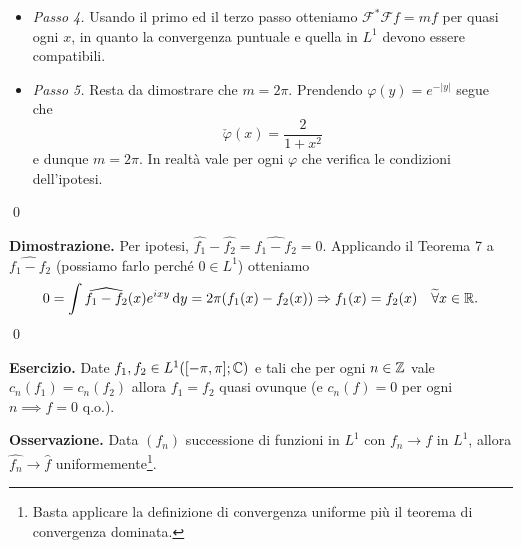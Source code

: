 \begin{itemize}
	\item \textit{Passo 4.} Usando il primo ed il terzo passo otteniamo $\mathcal F^* \mathcal F f = m f$ per quasi ogni $x$, in quanto la convergenza puntuale e quella in $L^1$ devono essere compatibili. 

	\item \textit{Passo 5.} Resta da dimostrare che $m = 2\pi$. Prendendo $\varphi(y) = e^{-|y|}$ segue che
		$$
			\check \varphi(x) = \frac{2}{1 + x^2}
		$$
		e dunque $m = 2\pi$. In realtà vale per ogni $\varphi$ che verifica le condizioni dell'ipotesi.
\end{itemize}
\qed


\textbf{Dimostrazione.} Per ipotesi, $\hat{f_1} - \hat{f_2} = \hat{f_1 - f_2} = 0$.
Applicando il Teorema 7 a $\hat{f_1 - f_2}$ (possiamo farlo perché $0 \in L^1$) otteniamo
%
$$
	0 = \int \widehat{f_1 - f_2}(x) e^{ixy} \,\mathrm{d} y = 2\pi (f_1(x) - f_2(x)) 
	\Rightarrow f_1(x) = f_2(x) \quad \widetilde\forall x \in \mathbb R.
$$
%
\qed


\textbf{Esercizio.}
Date $f_1, f_2 \in L^1([-\pi, \pi]; \mathbb C)$ e tali che per ogni $n \in \mathbb Z$ vale $c_n(f_1) = c_n(f_2)$ allora $f_1 = f_2$ quasi ovunque (e $c_n(f) = 0$ per ogni $n \implies f = 0$ q.o.).

\textbf{Osservazione.} Data $(f_n)$ successione di funzioni in $L^1$ con $f_n \to f$ in $L^1$, allora $\hat{f_n} \to \hat{f}$ uniformemente\footnote{Basta applicare la definizione di convergenza uniforme più il teorema di convergenza dominata.}. 









